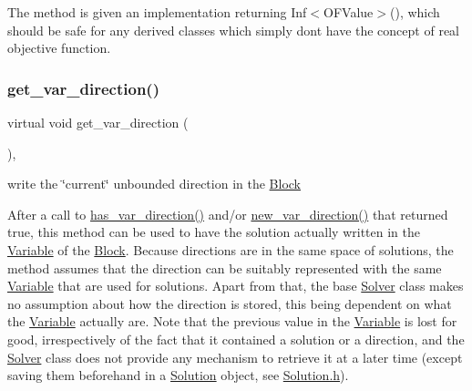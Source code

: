The method is given an implementation returning Inf$<$\+O\+F\+Value$>$(), which should be safe for any derived classes which simply don\textquotesingle{}t have the concept of real objective function. \mbox{\label{class_s_m_spp__di__unipi__it_1_1_solver_a4bc119810c0c2ee3ba0c48183f50aaf4}} 
\subsubsection{\texorpdfstring{get\+\_\+var\+\_\+direction()}{get\_var\_direction()}}
{\footnotesize\ttfamily virtual void get\+\_\+var\+\_\+direction (\begin{DoxyParamCaption}\item[{void}]{ }\end{DoxyParamCaption})\hspace{0.3cm}{\ttfamily [inline]}, {\ttfamily [virtual]}}



write the \char`\"{}current\char`\"{} unbounded direction in the \mbox{\hyperlink{class_s_m_spp__di__unipi__it_1_1_block}{Block}} 

After a call to \mbox{\hyperlink{class_s_m_spp__di__unipi__it_1_1_solver_a27e8c876f577289e523ebf26aeeb977a}{has\+\_\+var\+\_\+direction()}} and/or \mbox{\hyperlink{class_s_m_spp__di__unipi__it_1_1_solver_a673fc1c81a1fc86e55dfab3a37f303bc}{new\+\_\+var\+\_\+direction()}} that returned true, this method can be used to have the solution actually written in the \mbox{\hyperlink{class_s_m_spp__di__unipi__it_1_1_variable}{Variable}} of the \mbox{\hyperlink{class_s_m_spp__di__unipi__it_1_1_block}{Block}}. Because directions are in the same space of solutions, the method assumes that the direction can be suitably represented with the same \mbox{\hyperlink{class_s_m_spp__di__unipi__it_1_1_variable}{Variable}} that are used for solutions. Apart from that, the base \mbox{\hyperlink{class_s_m_spp__di__unipi__it_1_1_solver}{Solver}} class makes no assumption about how the direction is stored, this being dependent on what the \mbox{\hyperlink{class_s_m_spp__di__unipi__it_1_1_variable}{Variable}} actually are. Note that the previous value in the \mbox{\hyperlink{class_s_m_spp__di__unipi__it_1_1_variable}{Variable}} is lost for good, irrespectively of the fact that it contained a solution or a direction, and the \mbox{\hyperlink{class_s_m_spp__di__unipi__it_1_1_solver}{Solver}} class does not provide any mechanism to retrieve it at a later time (except saving them beforehand in a \mbox{\hyperlink{class_s_m_spp__di__unipi__it_1_1_solution}{Solution}} object, see \mbox{\hyperlink{_solution_8h}{Solution.\+h}}).

